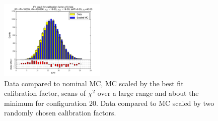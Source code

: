 \begin{figure}[htbp]
\begin{center}
\includegraphics[width=0.45\textwidth]{../FIGURES/20/FIG_Fit_result_for_calibration_factor_of_0_944.pdf} 
\caption{Data compared to nominal MC, MC scaled by the best fit calibration factor, scans of $\chi^2$ over a large range and about the minimum for configuration 20. Data compared to MC scaled by two randomly chosen calibration factors.} 
\label{tab:best_20} 
\end{center} \end{figure} 

